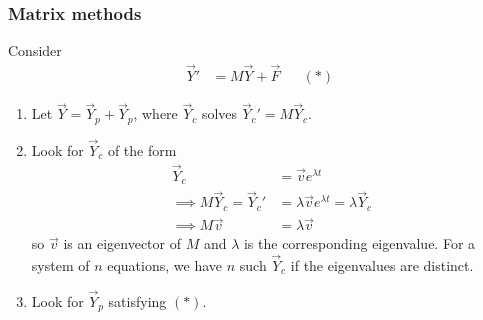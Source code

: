 \documentclass{../../template/note}
\begin{document}
    \subsubsection{Matrix methods}

    Consider
    \begin{align*}
        \vec Y' &= M \vec Y + \vec F && (*)
    \end{align*}
    \begin{enumerate}[label=\protect\circled{\arabic*}]
        \item Let \(\vec Y = \vec Y_p + \vec Y_p\), where \(\vec Y_c\) solves \(\vec Y_c' = M \vec Y_c\).
        \item Look for \(\vec Y_c\) of the form
        \begin{align*}
            \vec Y_c &= \vec v e^{\lambda t} \\
            \implies M \vec Y_c = \vec Y_c' &= \lambda \vec v e^{\lambda t} = \lambda \vec Y_c \\
            \implies M \vec v &= \lambda \vec v
        \end{align*}
        so \(\vec v\) is an eigenvector of \(M\) and \(\lambda\) is the corresponding eigenvalue. For a system of \(n\) equations, we have \(n\) such \(\vec Y_c\) if the eigenvalues are distinct.
        \item Look for \(\vec Y_p\) satisfying \((*)\).
        
    \end{enumerate}
    
\end{document}

